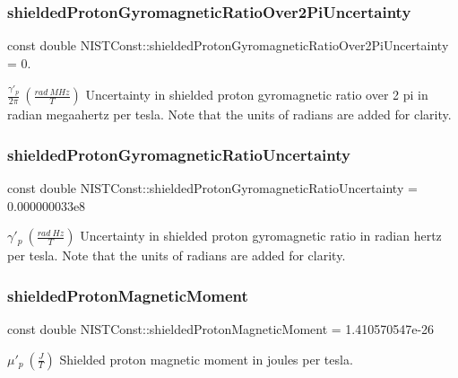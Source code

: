 \subsubsection{\texorpdfstring{shielded\+Proton\+Gyromagnetic\+Ratio\+Over2\+Pi\+Uncertainty}{shieldedProtonGyromagneticRatioOver2PiUncertainty}}
{\footnotesize\ttfamily const double N\+I\+S\+T\+Const\+::shielded\+Proton\+Gyromagnetic\+Ratio\+Over2\+Pi\+Uncertainty = 0.}

$\frac{\gamma'_p}{2 \pi} \ (\frac{rad\ MHz}{T})$ Uncertainty in shielded proton gyromagnetic ratio over 2 pi in radian megaahertz per tesla. Note that the units of radians are added for clarity. \mbox{\label{group___n_i_s_t_const-_proton_gae603375639410bab3920a82ad88e22b8}} 
\subsubsection{\texorpdfstring{shielded\+Proton\+Gyromagnetic\+Ratio\+Uncertainty}{shieldedProtonGyromagneticRatioUncertainty}}
{\footnotesize\ttfamily const double N\+I\+S\+T\+Const\+::shielded\+Proton\+Gyromagnetic\+Ratio\+Uncertainty = 0.\+000000033e8}

$\gamma'_p \ (\frac{rad\ Hz}{T})$ Uncertainty in shielded proton gyromagnetic ratio in radian hertz per tesla. Note that the units of radians are added for clarity. \mbox{\label{group___n_i_s_t_const-_proton_ga3e2c09881642d47d3e869c7803862e6f}} 
\subsubsection{\texorpdfstring{shielded\+Proton\+Magnetic\+Moment}{shieldedProtonMagneticMoment}}
{\footnotesize\ttfamily const double N\+I\+S\+T\+Const\+::shielded\+Proton\+Magnetic\+Moment = 1.\+410570547e-\/26}

$\mu'_p \ (\frac{J}{T})$ Shielded proton magnetic moment in joules per tesla. \mbox{\label{group___n_i_s_t_const-_proton_ga175eb518370bc31471e8ad763e760b72}} 
